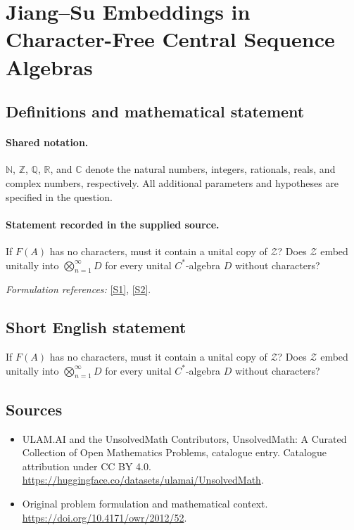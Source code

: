 \documentclass[11pt]{article}
\newcommand{\sref}[2]{\hyperlink{source:#1:#2}{[S#2]}}
\begin{document}
\section{Jiang–Su Embeddings in Character-Free Central Sequence Algebras}\label{statement}

\subsection{Definitions and mathematical statement}

\paragraph{Shared notation.}$\mathbb N$, $\mathbb Z$, $\mathbb Q$, $\mathbb R$, and $\mathbb C$ denote the natural numbers, integers, rationals, reals, and complex numbers, respectively. All additional parameters and hypotheses are specified in the question.


\paragraph{Statement recorded in the supplied source.}
If $F(A)$ has no characters, must it contain a unital copy of $\mathcal Z$? Does $\mathcal Z$ embed unitally into $\bigotimes_{n=1}^{\infty}D$ for every unital $C^*$-algebra $D$ without characters?
\par\smallskip\textit{Formulation references:} \sref{statement}{1}, \sref{statement}{2}.
\subsection{Short English statement}
If $F(A)$ has no characters, must it contain a unital copy of $\mathcal Z$? Does $\mathcal Z$ embed unitally into $\bigotimes_{n=1}^{\infty}D$ for every unital $C^*$-algebra $D$ without characters?
\subsection{Sources}
\begin{itemize}
\item[\hypertarget{source:statement:1}{S1}] ULAM.AI and the UnsolvedMath Contributors, UnsolvedMath: A Curated Collection of Open Mathematics Problems, catalogue entry. Catalogue attribution under CC BY 4.0.
\url{https://huggingface.co/datasets/ulamai/UnsolvedMath}.
\item[\hypertarget{source:statement:2}{S2}] Original problem formulation and mathematical context.
\url{https://doi.org/10.4171/owr/2012/52}.
\end{itemize}
\label{end:statement}
\end{document}
